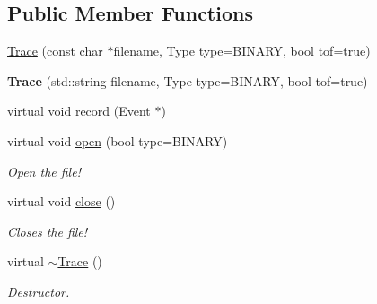 \subsection*{Public Member Functions}
\begin{DoxyCompactItemize}
\item 
\hyperlink{classMetaSim_1_1Trace_a479f2ba3dafd5c6f9a8091c378970889}{Trace} (const char $\ast$filename, Type type=B\+I\+N\+A\+RY, bool tof=true)
\item 
{\bfseries Trace} (std\+::string filename, Type type=B\+I\+N\+A\+RY, bool tof=true)\hypertarget{classMetaSim_1_1Trace_a90c6cc23632469d3034ae6d6d4a47cc5}{}\label{classMetaSim_1_1Trace_a90c6cc23632469d3034ae6d6d4a47cc5}

\item 
virtual void \hyperlink{classMetaSim_1_1Trace_a4284196f04d6639f4bb9bb2fc7662ea6}{record} (\hyperlink{classMetaSim_1_1Event}{Event} $\ast$)
\item 
virtual void \hyperlink{classMetaSim_1_1Trace_a9f2815326488c04359602ec51e42c20b}{open} (bool type=B\+I\+N\+A\+RY)\hypertarget{classMetaSim_1_1Trace_a9f2815326488c04359602ec51e42c20b}{}\label{classMetaSim_1_1Trace_a9f2815326488c04359602ec51e42c20b}

\begin{DoxyCompactList}\small\item\em Open the file! \end{DoxyCompactList}\item 
virtual void \hyperlink{classMetaSim_1_1Trace_a85fa7e84b02da842999db6d6f4094a81}{close} ()\hypertarget{classMetaSim_1_1Trace_a85fa7e84b02da842999db6d6f4094a81}{}\label{classMetaSim_1_1Trace_a85fa7e84b02da842999db6d6f4094a81}

\begin{DoxyCompactList}\small\item\em Closes the file! \end{DoxyCompactList}\item 
virtual \hyperlink{classMetaSim_1_1Trace_a8f6b6536c30629a7fef60a0877f5a44c}{$\sim$\+Trace} ()\hypertarget{classMetaSim_1_1Trace_a8f6b6536c30629a7fef60a0877f5a44c}{}\label{classMetaSim_1_1Trace_a8f6b6536c30629a7fef60a0877f5a44c}

\begin{DoxyCompactList}\small\item\em Destructor. \end{DoxyCompactList}\end{DoxyCompactItemize}
